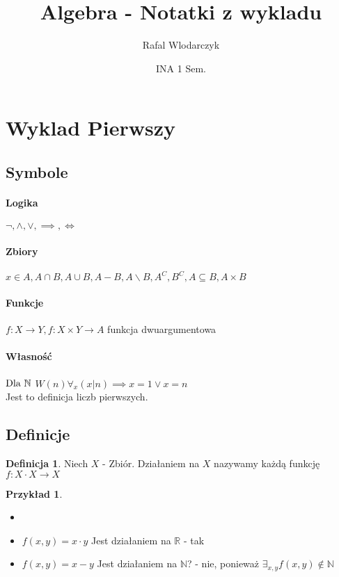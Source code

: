 \documentclass{article}
\author{Rafal Wlodarczyk}
\title{Algebra - Notatki z wykladu}
\date{INA 1 Sem.}
\theoremstyle{definition}
\newtheorem{de}{Definicja}[subsection]
\theoremstyle{definition}
\theoremstyle{definition}
\newtheorem{pk}{Przykład}[subsection]
\theoremstyle{definition}
\begin{document}
\maketitle

\section{Wyklad Pierwszy}

\subsection{Symbole}

\paragraph{Logika}

$\neg, \land, \lor, \implies, \iff$

\paragraph{Zbiory}

$x\in A, A \cap B, A \cup B, A - B, A\backslash B, A^C, B^C, A\subseteq B, A\times B$

\paragraph{Funkcje}

$f: X\rightarrow Y, f: X\times Y\rightarrow A$ funkcja dwuargumentowa

\paragraph{Własność}

$\\\text{Dla } \mathbb{N}$
$W(n) \forall_{x} (x|n)\implies x=1 \lor x=n$
\\Jest to definicja liczb pierwszych.

\subsection{Definicje}

\begin{de}
Niech $X$ - Zbiór. Działaniem na $X$ nazywamy każdą funkcję $f:X\cdot X\rightarrow X$
\end{de}

\begin{pk}
\begin{itemize}
\item[]
\item $f(x,y)=x\cdot y$ Jest działaniem na $\mathbb{R}$ - tak
\item $f(x,y)=x-y$ Jest działaniem na $\mathbb{N}$? - nie, ponieważ $\exists_{x,y} f(x,y)\notin \mathbb{N}$
\end{itemize}
\end{pk}
\end{document}
